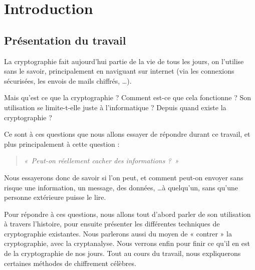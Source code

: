 \chapter{Introduction}

\section{Présentation du travail}
La cryptographie fait aujourd'hui partie de la vie de tous les jours,
on l'utilise sans le savoir, principalement en naviguant sur internet
(via les connexions sécurisées, les envois de mails chiffrés, \dots).

Mais qu'est ce que la cryptographie ? Comment est-ce que cela
fonctionne ? Son utilisation se limite-t-elle juste à l'informatique ?
Depuis quand existe la cryptographie ?

Ce sont à ces questions que nous allons essayer de répondre durant ce
travail, et plus principalement à cette question :

\begin{quote}
\emph{«~Peut-on réellement cacher des informations ?~»}
\end{quote}

Nous essayerons donc de savoir si l'on peut, et comment peut-on
envoyer sans risque une information, un message, des données, \dots à
quelqu'un, sans qu'une personne extérieure puisse le lire.

Pour répondre à ces questions, nous allons tout d'abord parler de son
utilisation à travers l'histoire, pour ensuite présenter les
différentes techniques de cryptographie existantes. Nous parlerons
aussi du moyen de « contrer » la cryptographie, avec la
cryptanalyse. Nous verrons enfin pour finir ce qu'il en est de la
cryptographie de nos jours. Tout au cours du travail, nous
expliquerons certaines méthodes de chiffrement célèbres.


